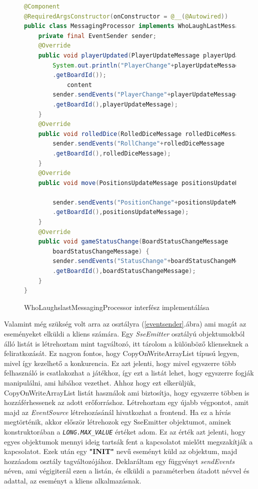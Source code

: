 \documentclass[a4paper,twoside]{article}
\begin{document}
\begin{figure}
	\caption{WhoLaughslastMessagingProcessor interfész implementálása}
	\begin{lstlisting}[language=java,breaklines=true]	
@Component
@RequiredArgsConstructor(onConstructor = @__(@Autowired))
public class MessagingProcessor implements WhoLaughLastMessagingProcessor{
	private final EventSender sender;
	@Override
	public void playerUpdated(PlayerUpdateMessage playerUpdateMessage) {
		System.out.println("PlayerChange"+playerUpdateMessage
		.getBoardId());
			content
		sender.sendEvents("PlayerChange"+playerUpdateMessage
		.getBoardId(),playerUpdateMessage);
	}
	@Override
	public void rolledDice(RolledDiceMessage rolledDiceMessage) {
		sender.sendEvents("RollChange"+rolledDiceMessage
		.getBoardId(),rolledDiceMessage);
	}
	@Override
	public void move(PositionsUpdateMessage positionsUpdateMessage) {
		
		sender.sendEvents("PositionChange"+positionsUpdateMessage
		.getBoardId(),positionsUpdateMessage);
	}
	@Override
	public void gameStatusChange(BoardStatusChangeMessage
		boardStatusChangeMessage) {
		sender.sendEvents("StatusChange"+boardStatusChangeMessage
		.getBoardId(),boardStatusChangeMessage);
	}
}
		\end{lstlisting}
		\label{messproc}
	\end{figure} 
	\FloatBarrier
Valamint még szükség volt arra az osztályra (\ref{eventsender}.ábra) ami magát az eseményeket elküldi a kliens számára.  Egy \textit{SseEmitter} osztályú objektumokból álló listát is létrehoztam mint tagváltozó, itt tárolom a különböző klienseknek a feliratkozását. Ez nagyon fontos, hogy CopyOnWriteArrayList típusú legyen, mivel így kezelhető a konkurencia. Ez azt jelenti, hogy mivel egyszerre több felhasználó is csatlakozhat a játékhoz, így ezt a listát lehet, hogy egyszerre fogják manipulálni, ami hibához vezethet. Ahhoz hogy ezt elkerüljük, CopyOnWriteArrayList listát használok ami biztosítja, hogy egyszerre többen is hozzáférhessenek az adott erőforráshoz. Létrehoztam egy újabb végpontot, amit majd az \textit{EventSource} létrehozásánál hivatkozhat a frontend.  Ha ez a hívás megtörténik, akkor először létrehozok egy SseEmitter objektumot, aminek konstruktorában a \textit{\texttt{LONG.MAX\_VALUE}} értéket adom. Ez az érték azt jelenti, hogy egyes objektumok mennyi ideig tartsák fent a kapcsolatot mielőtt megszakítják a kapcsolatot. Ezek után egy \textbf{"INIT"} nevű eseményt küld az objektum, majd hozzáadom osztály tagváltozójához. Deklaráltam egy függvényt \textit{sendEvents} néven, ami végigiterál ezen a listán, és elküldi a paraméterben átadott névvel és adattal, az eseményt a kliens alkalmazásnak.
\end{document}
